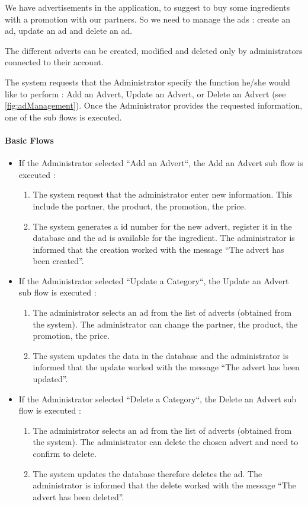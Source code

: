 {
  We have advertisements in the application, to suggest to buy some ingredients with a promotion with our partners. So we need to manage the ads : create an ad, update an ad and delete an ad.

  The different adverts can be created, modified and deleted only by administrators connected to their account.

}
{
  The system requests that the Administrator specify the function he/she would like to perform : Add an Advert, Update an Advert, or Delete an Advert (see \autoref{fig:adManagement}). Once the Administrator provides the requested information, one of the sub flows is executed.

  \paragraph{Basic Flows}
  \begin{itemize}
    \item If the Administrator selected “Add an Advert“, the Add an Advert sub flow is executed :
    \begin{enumerate}
      \item The system request that the administrator enter new information. This include the  partner, the product, the promotion, the price.
      \item The system generates a id number for the new advert, register it in the database and the ad is available for the ingredient. The administrator is informed that the creation worked with the message “The advert has been created”.
    \end{enumerate}
    \item If the Administrator selected “Update a Category“, the Update an Advert sub flow is executed :
    \begin{enumerate}
      \item The administrator selects an ad from the list of adverts (obtained from the system). The administrator can change the  partner, the product, the promotion, the price.
      \item The system updates the data in the database and the administrator is informed that the update worked with the message “The advert has been updated”.
    \end{enumerate}
    \item If the Administrator selected “Delete a Category“, the Delete an Advert sub flow is executed :
    \begin{enumerate}
      \item The administrator selects an ad from the list of adverts (obtained from the system). The administrator can delete the chosen advert and need to confirm to delete.
      \item The system updates the database therefore deletes the ad. The administrator is informed that the delete worked with the message “The advert has been deleted”.
    \end{enumerate}
  \end{itemize}

}
